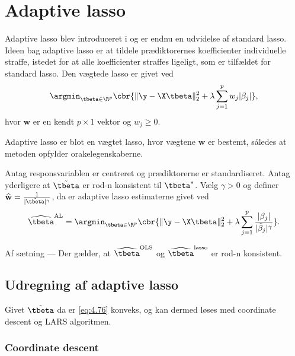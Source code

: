\section{Adaptive lasso}
Adaptive lasso blev introduceret i \citep{adaptive_lasso} og er endnu en udvidelse af standard lasso.
Ideen bag adaptive lasso er at tildele prædiktorernes koefficienter individuelle straffe, istedet for at alle koefficienter straffes ligeligt, som er tilfældet for standard lasso.
Den vægtede lasso er givet ved
\begin{align*}
\argmin_{\tbeta \in \R^p} \cbr{\Vert \y - \X \tbeta \Vert_2^2 + \lambda \sum_{j=1}^p w_j \vert \beta_j \vert},
\end{align*}
hvor \(\mathbf{w}\) er en kendt \(p \times 1\) vektor og \(w_j \geq 0\).

Adaptive lasso er blot en vægtet lasso, hvor vægtene \(\mathbf{w}\) er bestemt, således at metoden opfylder orakelegenskaberne.
\begin{defn}
Antag responsvariablen er centreret og prædiktorerne er standardiseret.
Antag yderligere at \(\tilde{\tbeta}\) er rod-n konsistent til \(\tbeta^*\).
Vælg \(\gamma>0\) og definer \(\widehat{\mathbf{w}} = \frac{1}{\vert \tilde{\tbeta} \vert^\gamma}\), da er adaptive lasso estimaterne givet ved
\begin{align}
\widehat{\tbeta}^\text{AL} = \argmin_{\tbeta \in \R^p} \cbr{ \Vert \y - \X \tbeta \Vert_2^2 + \lambda \sum_{j=1}^p \frac{ \vert \beta_j \vert}{\vert \tilde{\beta}_j \vert^\gamma}}. \label{eq:4.76}
\end{align}
\end{defn}
Af sætning --- Der gælder, at \(\widehat{\tbeta}^\text{OLS}\) og \(\widehat{\tbeta}^\text{lasso}\) er rod-n konsistent.

\subsection{Udregning af adaptive lasso}
Givet \(\tilde{\tbeta}\) da er \eqref{eq:4.76} konveks, og kan dermed løses med coordinate descent og LARS algoritmen.
\subsubsection{Coordinate descent}

